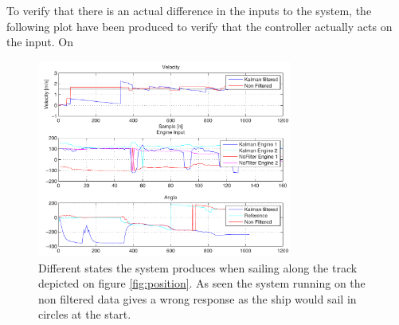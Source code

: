 \documentclass[journal]{IEEEtran}
\begin{document}
To verify that there is an actual difference in the inputs to the system, the following plot have been produced to verify that the controller actually acts on the input. On 
\begin{figure}
	\begin{center}
		\includegraphics[width=8.4cm]{img/states}    %
		\caption{Different states the system produces when sailing along the track depicted on figure \ref{fig:position}. As seen the system running on the non filtered data gives a wrong response as the ship would sail in circles at the start.}  %
		\label{fig:states}               
	\end{center}                                 %
\end{figure}
\end{document}
